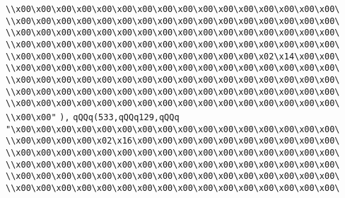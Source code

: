 \verb|\\x00\x00\x00\x00\x00\x00\x00\x00\x00\x00\x00\x00\x00\x00\x00\x00\|\newline
\verb|\\x00\x00\x00\x00\x00\x00\x00\x00\x00\x00\x00\x00\x00\x00\x00\x00\|\newline
\verb|\\x00\x00\x00\x00\x00\x00\x00\x00\x00\x00\x00\x00\x00\x00\x00\x00\|\newline
\verb|\\x00\x00\x00\x00\x00\x00\x00\x00\x00\x00\x00\x00\x00\x00\x00\x00\|\newline
\verb|\\x00\x00\x00\x00\x00\x00\x00\x00\x00\x00\x00\x00\x02\x14\x00\x00\|\newline
\verb|\\x00\x00\x00\x00\x00\x00\x00\x00\x00\x00\x00\x00\x00\x00\x00\x00\|\newline
\verb|\\x00\x00\x00\x00\x00\x00\x00\x00\x00\x00\x00\x00\x00\x00\x00\x00\|\newline
\verb|\\x00\x00\x00\x00\x00\x00\x00\x00\x00\x00\x00\x00\x00\x00\x00\x00\|\newline
\verb|\\x00\x00\x00\x00\x00\x00\x00\x00\x00\x00\x00\x00\x00\x00\x00\x00\|\newline
\verb|\\x00\x00"|\newline
\verb|),|\newline
\verb|qQQq(533,qQQq129,qQQq|\newline
\verb|"\x00\x00\x00\x00\x00\x00\x00\x00\x00\x00\x00\x00\x00\x00\x00\x00\|\newline
\verb|\\x00\x00\x00\x00\x02\x16\x00\x00\x00\x00\x00\x00\x00\x00\x00\x00\|\newline
\verb|\\x00\x00\x00\x00\x00\x00\x00\x00\x00\x00\x00\x00\x00\x00\x00\x00\|\newline
\verb|\\x00\x00\x00\x00\x00\x00\x00\x00\x00\x00\x00\x00\x00\x00\x00\x00\|\newline
\verb|\\x00\x00\x00\x00\x00\x00\x00\x00\x00\x00\x00\x00\x00\x00\x00\x00\|\newline
\verb|\\x00\x00\x00\x00\x00\x00\x00\x00\x00\x00\x00\x00\x00\x00\x00\x00\|\newline
